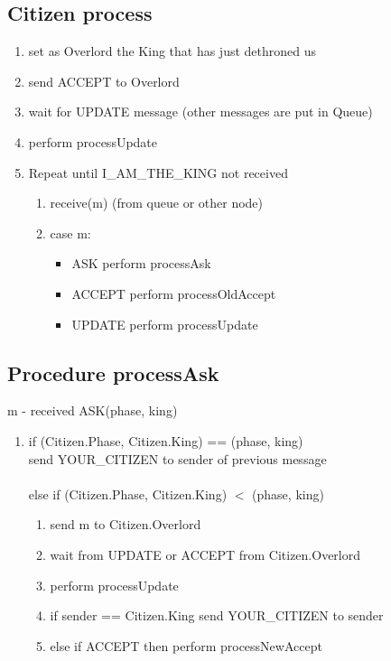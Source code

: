 \documentclass{article}
\begin{document}
\subsection*{Citizen process}
    \begin{enumerate}
        \item set as Overlord the King that has just dethroned us
        \item send ACCEPT to Overlord
        \item wait for UPDATE message (other messages are put in Queue)
        \item perform processUpdate 
        \item Repeat until I\_AM\_THE\_KING not received
            \begin{enumerate}
                \item receive(m) (from queue or other node)
                \item case m:
                \begin{itemize}
                    \item[] ASK perform processAsk
                    \item[] ACCEPT perform processOldAccept
                    \item[] UPDATE perform processUpdate
                \end{itemize}
            \end{enumerate}
    \end{enumerate}

\subsection*{Procedure processAsk}
    m - received ASK(phase, king)
    \begin{enumerate}
    \item if (Citizen.Phase, Citizen.King) == (phase, king) \\ send YOUR\_CITIZEN to sender of previous message\\ \\else if (Citizen.Phase, Citizen.King) \(<\) (phase, king)
    \begin{enumerate}
        \item send m to Citizen.Overlord
        \item wait from UPDATE or ACCEPT from Citizen.Overlord
        \item perform processUpdate
        \item if sender == Citizen.King send YOUR\_CITIZEN to sender
        \item else if ACCEPT then perform processNewAccept
    \end{enumerate}
 \end{enumerate}
\end{document}
